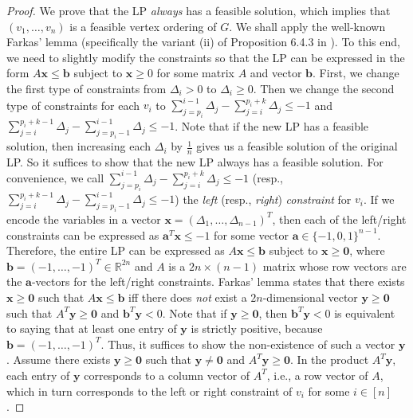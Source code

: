 \documentclass[english]{lipics-v2021}
\begin{document}
\begin{proof}
We prove that the LP \textit{always} has a feasible solution, which implies that $(v_1,\dots,v_n)$ is a feasible vertex ordering of $G$.
We shall apply the well-known Farkas' lemma (specifically the variant (ii) of Proposition 6.4.3 in \cite{farkas-book}).
To this end, we need to slightly modify the constraints so that the LP can be expressed in the form $A \mathbf{x} \leq \mathbf{b}$ subject to $\mathbf{x} \geq 0$ for some matrix $A$ and vector $\mathbf{b}$.
First, we change the first type of constraints from $\Delta_i > 0$ to $\Delta_i \geq 0$.
Then we change the second type of constraints for each $v_i$ to $\sum_{j=p_i}^{i-1} \Delta_j - \sum_{j=i}^{p_i+k} \Delta_j \leq -1$ and $\sum_{j=i}^{p_i+k-1} \Delta_j - \sum_{j=p_i-1}^{i-1} \Delta_j \leq -1$.
Note that if the new LP has a feasible solution, then increasing each $\Delta_i$ by $\frac{1}{n}$ gives us a feasible solution of the original LP.
So it suffices to show that the new LP always has a feasible solution.
For convenience, we call $\sum_{j=p_i}^{i-1} \Delta_j - \sum_{j=i}^{p_i+k} \Delta_j \leq -1$ (resp., $\sum_{j=i}^{p_i+k-1} \Delta_j - \sum_{j=p_i-1}^{i-1} \Delta_j \leq -1$) the \textit{left} (resp., \textit{right}) \textit{constraint} for $v_i$.
If we encode the variables in a vector $\mathbf{x} = (\Delta_1,\dots,\Delta_{n-1})^T$, then each of the left/right constraints can be expressed as $\mathbf{a}^T \mathbf{x} \leq -1$ for some vector $\mathbf{a} \in \{-1,0,1\}^{n-1}$.
Therefore, the entire LP can be expressed as $A \mathbf{x} \leq \mathbf{b}$ subject to $\mathbf{x} \geq \mathbf{0}$, where $\mathbf{b} = (-1,\dots,-1)^T \in \mathbb{R}^{2n}$ and $A$ is a $2n \times (n-1)$ matrix whose row vectors are the $\mathbf{a}$-vectors for the left/right constraints.
Farkas' lemma states that there exists $\mathbf{x} \geq \mathbf{0}$ such that $A \mathbf{x} \leq \mathbf{b}$ iff there does \textit{not} exist a $2n$-dimensional vector $\mathbf{y} \geq \mathbf{0}$ such that $A^T \mathbf{y} \geq \mathbf{0}$ and $\mathbf{b}^T \mathbf{y} < 0$.
Note that if $\mathbf{y} \geq \mathbf{0}$, then $\mathbf{b}^T \mathbf{y} < 0$ is equivalent to saying that at least one entry of $\mathbf{y}$ is strictly positive, because $\mathbf{b} = (-1,\dots,-1)^T$.
Thus, it suffices to show the non-existence of such a vector $\mathbf{y}$.
Assume there exists $\mathbf{y} \geq \mathbf{0}$ such that $\mathbf{y} \neq \mathbf{0}$ and $A^T \mathbf{y} \geq \mathbf{0}$.
In the product $A^T \mathbf{y}$, each entry of $\mathbf{y}$ corresponds to a column vector of $A^T$, i.e., a row vector of $A$, which in turn corresponds to the left or right constraint of $v_i$ for some $i \in [n]$.

\end{proof}
\end{document}
